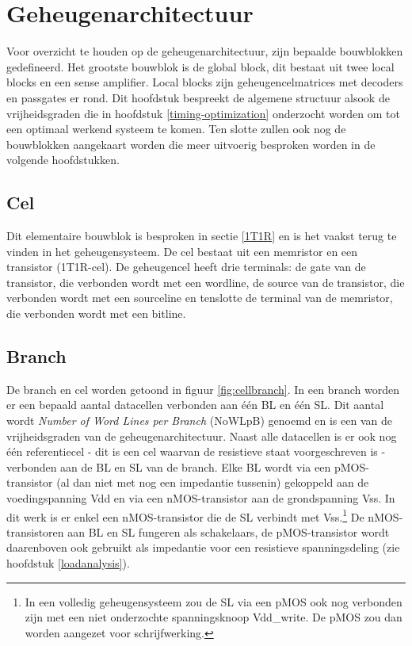 \chapter{Geheugenarchitectuur}
\label{architecture}
Voor overzicht te houden op de geheugenarchitectuur, zijn bepaalde bouwblokken gedefineerd. Het grootste bouwblok is de global block, dit bestaat uit twee local blocks en een sense amplifier. Local blocks zijn geheugencelmatrices met decoders en passgates er rond.
Dit hoofdstuk bespreekt de algemene structuur alsook de vrijheidsgraden die in hoofdstuk \ref{timing-optimization} onderzocht worden om tot een optimaal werkend systeem te komen. Ten slotte zullen ook nog de bouwblokken aangekaart worden die meer uitvoerig besproken worden in de volgende hoofdstukken. 


\section{Cel}
Dit elementaire bouwblok is besproken in sectie \ref{1T1R} en is het vaakst terug te vinden in het geheugensysteem.
De cel bestaat uit een memristor en een transistor (1T1R-cel). De geheugencel heeft drie terminals: de gate van de transistor, die verbonden wordt met een wordline, de source van de transistor, die verbonden wordt met een sourceline en tenslotte de terminal van de memristor, die verbonden wordt met een bitline.

\section{Branch}
De branch en cel worden getoond in figuur \ref{fig:cellbranch}. In een branch worden er een bepaald aantal datacellen verbonden aan één BL en één SL. Dit aantal wordt \emph{Number of Word Lines per Branch} (NoWLpB) genoemd en is een van de vrijheidsgraden van de geheugenarchitectuur. Naast alle datacellen is er ook nog één referentiecel - dit is een cel waarvan de resistieve staat voorgeschreven is - verbonden aan de BL en SL van de branch.
Elke BL wordt via een pMOS-transistor (al dan niet met nog een impedantie tussenin) gekoppeld aan de voedingspanning Vdd en via een nMOS-transistor aan de grondspanning Vss. In dit werk is er enkel een nMOS-transistor die de SL verbindt met Vss.\footnote{In een volledig geheugensysteem zou de SL via een pMOS ook nog verbonden zijn met een niet onderzochte spanningsknoop Vdd\_write. De pMOS zou dan worden aangezet voor schrijfwerking.} De nMOS-transistoren aan BL en SL fungeren als schakelaars, de pMOS-transistor wordt daarenboven ook gebruikt als impedantie voor een resistieve spanningsdeling (zie hoofdstuk \ref{loadanalysis}).

